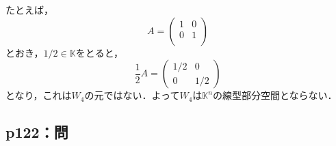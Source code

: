 \documentclass[uplatex,dvipdfmx,a4paper,11pt,fleqn]{jsarticle}
\begin{document}
\begin{leftbar}
\begin{description}
        たとえば，
        \[ 
            A= \begin{pmatrix} 1 & 0 \\ 0 & 1 \\ \end{pmatrix}
        \]
        とおき，$ 1/2 \in \mathbb{K}$をとると，
        \[
            \frac{1}{2} A = \begin{pmatrix} 1/2 & 0 \\ 0 & 1/2 \end{pmatrix}
        \]
        となり，これは$W_4$の元ではない．よって$W_4$は$\mathbb{K}^n$の線型部分空間とならない．
    \end{description}
\end{leftbar}
\newpage 

\subsection*{p122：問}
\end{document}
